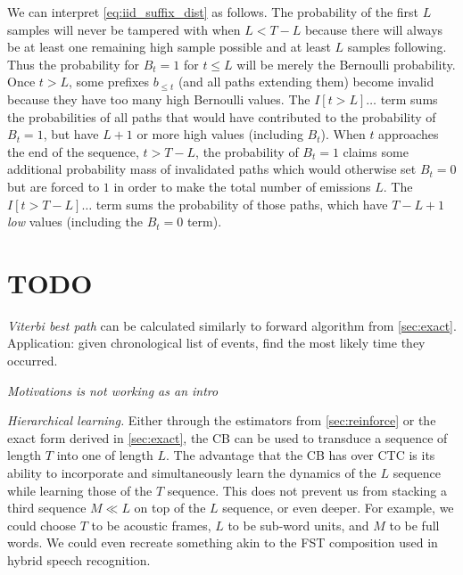 \documentclass{article}
\begin{document}
We can interpret \cref{eq:iid_suffix_dist} as follows. The probability of the
first $L$ samples will never be tampered with when $L < T - L$ because there
will always be at least one remaining high sample possible and at least $L$
samples following. Thus the probability for $B_t = 1$ for $t \leq L$ will be
merely the Bernoulli probability. Once $t > L$, some prefixes $b_{\leq t}$ (and
all paths extending them) become invalid because they have too many high
Bernoulli values. The $I[t > L]\ldots$ term sums the probabilities of all paths
that would have contributed to the probability of $B_t=1$, but have $L + 1$ or
more high values (including $B_t$). When $t$ approaches the end of the
sequence, $t > T - L$, the probability of $B_t=1$ claims some additional
probability mass of invalidated paths which would otherwise set $B_t=0$ but are
forced to $1$ in order to make the total number of emissions $L$. The $I[t > T
- L]\ldots$ term sums the probability of those paths, which have $T - L + 1$
\emph{low} values (including the $B_t=0$ term).

\section{TODO}

\emph{Viterbi best path} can be calculated similarly to forward algorithm from
\cref{sec:exact}. Application: given chronological list of events, find the
most likely time they occurred.

\emph{Motivations is not working as an intro}

\emph{Hierarchical learning.} Either through the estimators from
\cref{sec:reinforce} or the exact form derived in \cref{sec:exact}, the CB can
be used to transduce a sequence of length $T$ into one of length $L$. The
advantage that the CB has over CTC is its ability to incorporate and
simultaneously learn the dynamics of the $L$ sequence while learning those of
the $T$ sequence. This does not prevent us from stacking a third sequence
$M \ll L$ on top of the $L$ sequence, or even deeper. For example, we could
choose $T$ to be acoustic frames, $L$ to be sub-word units, and $M$ to be full
words. We could even recreate something akin to the FST composition used in
hybrid speech recognition.

\end{document}
